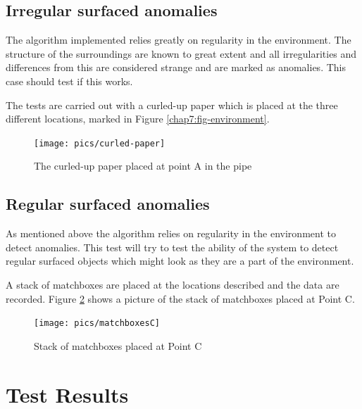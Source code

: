 \subsection{Irregular surfaced anomalies}
The algorithm implemented relies greatly on regularity in the environment. The structure
of the surroundings are known to great extent and all irregularities and differences from
this are considered strange and are marked as anomalies. This case should test if this
works.

The tests are carried out with a curled-up paper which is placed at the three different
locations, marked in Figure \ref{chap7:fig-environment}. 
\begin{figure}[htbp]
    \centering
    \texttt{[image: pics/curled-paper]}
    \caption{The curled-up paper placed at point A in the pipe}
    \label{chap7:fig-culed-up-paper-at-A}
\end{figure}



\subsection{Regular surfaced anomalies}
As mentioned above the algorithm relies on regularity in the environment to detect
anomalies. This test will try to test the ability of the system to detect regular surfaced
objects which might look as they are a part of the environment. 

A stack of matchboxes are placed at the locations described and the data are recorded.
Figure \ref{chap7:fig-matchboxes-at-C} shows a picture of the stack of matchboxes placed
at Point C.
\begin{figure}[htbp]
    \centering
    \texttt{[image: pics/matchboxesC]}
    \caption{Stack of matchboxes placed at Point C}
    \label{chap7:fig-matchboxes-at-C}
\end{figure}



\section{Test Results}



